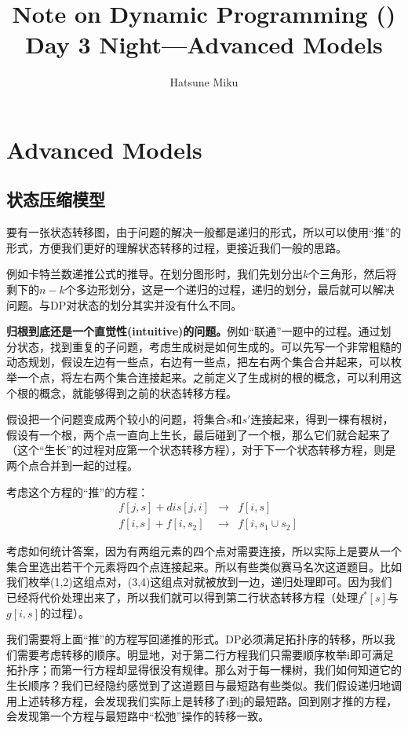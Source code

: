\documentclass{article}
\newcommand{\romannum}[1]{\uppercase\expandafter{\romannumeral#1}}
\begin{document}
\title{Note on Dynamic Programming (\romannum{3})\\\large{Day 3 Night---Advanced Models}}\date{}\author{Hatsune Miku}
\maketitle
\section{Advanced Models}
\subsection{状态压缩模型}
要有一张状态转移图，由于问题的解决一般都是递归的形式，所以可以使用“推”的形式，方便我们更好的理解状态转移的过程，更接近我们一般的思路。

例如卡特兰数递推公式的推导。在划分图形时，我们先划分出$k$个三角形，然后将剩下的$n-k$个多边形划分，这是一个递归的过程，递归的划分，最后就可以解决问题。与DP对状态的划分其实并没有什么不同。

\textbf{归根到底还是一个直觉性(intuitive)的问题。}例如“联通”一题中的过程。通过划分状态，找到重复的子问题，考虑生成树是如何生成的。可以先写一个非常粗糙的动态规划，假设左边有一些点，右边有一些点，把左右两个集合合并起来，可以枚举一个点，将左右两个集合连接起来。之前定义了生成树的根的概念，可以利用这个根的概念，就能够得到之前的状态转移方程。

假设把一个问题变成两个较小的问题，将集合$s$和$s'$连接起来，得到一棵有根树，假设有一个根，两个点一直向上生长，最后碰到了一个根，那么它们就合起来了（这个“生长”的过程对应第一个状态转移方程），对于下一个状态转移方程，则是两个点合并到一起的过程。

考虑这个方程的“推”的方程：
\begin{equation*}
    \begin{aligned}
        &f[j,s]+dis[j,i]&\to& f[i,s]\\
        &f[i,s]+f[i,s_2]&\to& f[i,s_1\cup s_2]
    \end{aligned}
\end{equation*}

考虑如何统计答案，因为有两组元素的四个点对需要连接，所以实际上是要从一个集合里选出若干个元素将四个点连接起来。所以有些类似赛马名次这道题目。比如我们枚举(1,2)这组点对，(3,4)这组点对就被放到一边，递归处理即可。因为我们已经将代价处理出来了，所以我们就可以得到第二行状态转移方程（处理$f^*[s]$与$g[i,s]$的过程）。

我们需要将上面“推”的方程写回递推的形式。DP必须满足拓扑序的转移，所以我们需要考虑转移的顺序。明显地，对于第二行方程我们只需要顺序枚举i即可满足拓扑序；而第一行方程却显得很没有规律。那么对于每一棵树，我们如何知道它的生长顺序？我们已经隐约感觉到了这道题目与最短路有些类似。我们假设递归地调用上述转移方程，会发现我们实际上是转移了i到j的最短路。回到刚才推的方程，会发现第一个方程与最短路中“松弛”操作的转移一致。
\end{document}
